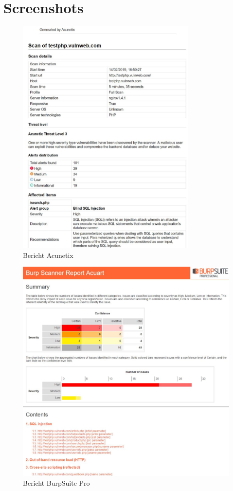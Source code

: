 \documentclass[12pt,oneside,a4paper,parskip,pointlessnumbers]{scrbook}
\begin{document}
  \chapter{Screenshots}
  \begin{figure}[htb!]
    \centering
      \includegraphics[width=0.8\textwidth]{Images/ScrAcunetix}
    \caption[Bericht Acunetix]{Bericht Acunetix}
  \end{figure}
  \begin{figure}[htb!]
    \centering
      \includegraphics[width=1\textwidth]{Images/ScrBurp}
    \caption[Bericht BurpSuite Pro]{Bericht BurpSuite Pro}
  \end{figure}
\end{document}
